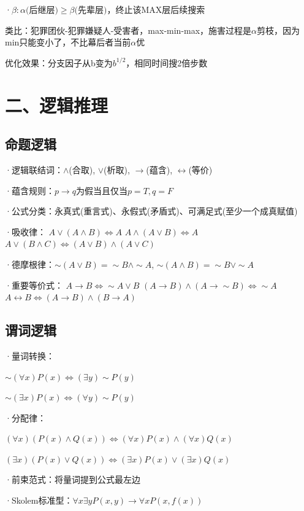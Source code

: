 	·$\beta : \alpha \text{(后继层)} \geq \beta \text{(先辈层)，}\text{终止该} \mathrm{MAX} \text{层后续搜索}$
	
	类比：犯罪团伙-犯罪嫌疑人-受害者，max-min-max，施害过程是$\alpha$剪枝，因为min只能变小了，不比幕后者当前$\alpha$优
	
	优化效果：分支因子从b变为$b^{1/2}$，相同时间搜2倍步数
	
	\section*{二、逻辑推理}
	
	\subsection*{命题逻辑}
	·逻辑联结词：$ \wedge $(合取), $ \vee $(析取), $ \rightarrow $(蕴含), $ \leftrightarrow $(等价)
	
	·蕴含规则：$ p\rightarrow q $为假当且仅当$ p=T,q=F $
	
	·公式分类：永真式(重言式)、永假式(矛盾式)、可满足式(至少一个成真赋值)
	
	·吸收律：
	$ A\vee(A\wedge B)\Leftrightarrow A $
	$ A\wedge(A\vee B)\Leftrightarrow A $
	$ A\vee(B\wedge C)\Leftrightarrow(A\vee B)\wedge(A\vee C) $
	
	·德摩根律：$\sim(A\vee B)=\sim B\wedge\sim A$, $\sim(A\wedge B)=\sim B\vee\sim A$
	
	·重要等价式：
	$ A\rightarrow B\Leftrightarrow\sim A\vee B $
	$ (A\rightarrow B)\wedge(A\rightarrow\sim B)\Leftrightarrow\sim A $
	$ A\leftrightarrow B\Leftrightarrow(A\rightarrow B)\wedge(B\rightarrow A) $
	
	\subsection*{谓词逻辑}
	·量词转换：
	
	$\sim(\forall x)P(x)\Leftrightarrow(\exists y)\sim P(y)$
	
	$\sim(\exists x)P(x)\Leftrightarrow(\forall y)\sim P(y)$
	
	·分配律：
	
	$ (\forall x)(P(x)\wedge Q(x))\Leftrightarrow(\forall x)P(x)\wedge(\forall x)Q(x) $
	
	$ (\exists x)(P(x)\vee Q(x))\Leftrightarrow(\exists x)P(x)\vee(\exists x)Q(x) $
	
	·前束范式：将量词提到公式最左边
	
	·Skolem标准型：$\forall x\exists yP(x,y)\to\forall xP(x,f(x))$
	
